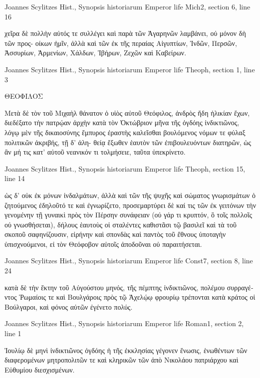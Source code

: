 \documentclass[12pt,letterpaper,twoside,final]{memoir}
\begin{document}
\begin{greek}
Joannes Scylitzes Hist., Synopsis historiarum 
Emperor life Mich2, section 6, line 16

                                                       χεῖρα δὲ πολλὴν αὐτός   
τε συλλέγει καὶ παρὰ τῶν Ἀγαρηνῶν λαμβάνει, οὐ μόνον δὴ τῶν προς-
οίκων ἡμῖν, ἀλλὰ καὶ τῶν ἐκ τῆς περαίας Αἰγυπτίων, Ἰνδῶν, Περσῶν, 
Ἀσσυρίων, Ἀρμενίων, Χάλδων, Ἰβήρων, Ζεχῶν καὶ Καβείρων. 



Joannes Scylitzes Hist., Synopsis historiarum 
Emperor life Theoph, section 1, line 3

ΘΕΟΦΙΛΟΣ


Μετὰ δὲ τὸν τοῦ Μιχαὴλ θάνατον ὁ υἱὸς αὐτοῦ Θεόφιλος, ἀνδρὸς 
ἤδη ἡλικίαν ἔχων, διεδέξατο τὴν πατρῴαν ἀρχὴν κατὰ τὸν Ὀκτώβριον 
μῆνα τῆς ὀγδόης ἰνδικτιῶνος, λόγῳ μὲν τῆς δικαιοσύνης ἔμπυρος ἐραστὴς 
καλεῖσθαι βουλόμενος νόμων τε φύλαξ πολιτικῶν ἀκριβής, τῇ δ' ἀλη-
θείᾳ ἔξωθεν ἑαυτὸν τῶν ἐπιβουλευόντων διατηρῶν, ὡς ἂν μή τις κατ' 
αὐτοῦ νεανικόν τι τολμήσειε, ταῦτα ὑπεκρίνετο. 



Joannes Scylitzes Hist., Synopsis historiarum 
Emperor life Theoph, section 15, line 14

                                                                 ὡς δ' οὐκ ἐκ μόνων 
ἰνδαλμάτων, ἀλλὰ καὶ τῶν τῆς ψυχῆς καὶ σώματος γνωρισμάτων ὁ 
ζητούμενος ἐδηλοῦτό τε καὶ ἐγνωρίζετο, προσεμαρτύρει δὲ καί τις τῶν 
ἐκ γειτόνων τὴν γενομένην τῇ γυναικὶ πρὸς τὸν Πέρσην συνάφειαν (οὐ 
γάρ τι κρυπτόν, ὃ τοῖς πολλοῖς οὐ γνωσθήσεται), δήλους ἑαυτοὺς οἱ 
σταλέντες καθιστᾶσι τῷ βασιλεῖ καὶ τὰ τοῦ σκοποῦ σαφηνίζουσιν, 
εἰρήνην καὶ σπονδὰς καὶ παντὸς τοῦ ἔθνους ὑποταγὴν ὑπισχνούμενοι, 
εἰ τὸν Θεόφοβον αὐτοῖς ἀποδοῦναι οὐ παραιτήσεται. 



Joannes Scylitzes Hist., Synopsis historiarum 
Emperor life Const7, section 8, line 24

                                                   κατὰ δὲ τὴν ἕκτην τοῦ 
Αὐγούστου μηνός, τῆς πέμπτης ἰνδικτιῶνος, πολέμου συρραγέντος 
Ῥωμαίοις τε καὶ Βουλγάροις πρὸς τῷ Ἀχελῴῳ φρουρίῳ τρέπονται κατὰ 
κράτος οἱ Βούλγαροι, καὶ φόνος αὐτῶν ἐγένετο πολύς. 



Joannes Scylitzes Hist., Synopsis historiarum 
Emperor life Roman1, section 2, line 1

Ἰουλίῳ δὲ μηνὶ ἰνδικτιῶνος ὀγδόης ἡ τῆς ἐκκλησίας γέγονεν 
ἕνωσις, ἑνωθέντων τῶν διαφερομένων μητροπολιτῶν τε καὶ κληρικῶν 
τῶν ἀπὸ Νικολάου πατριάρχου καὶ Εὐθυμίου διεσχισμένων. 




\end{greek}
\end{document}
